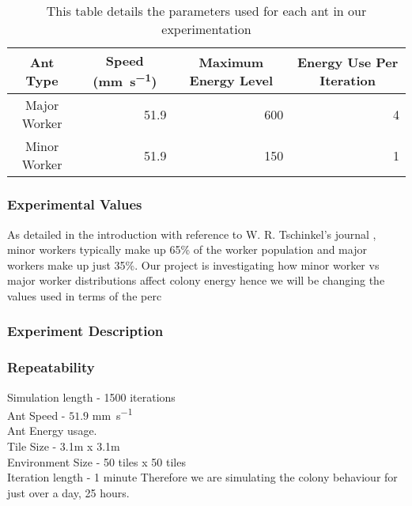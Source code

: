 \begin{table}[htb]
  \centering
  \caption{This table details the parameters used for each ant in our experimentation}
  \label{tab:ant-parameters}
  \begin{tabular}{@{}crrr@{}}
  \toprule
  Ant Type     & \multicolumn{1}{c}{Speed (\si{mm.s^{-1}})} & \multicolumn{1}{c}{Maximum Energy Level} & \multicolumn{1}{c}{Energy Use Per Iteration} \\ \midrule
  Major Worker & 51.9                             &  600                                    & 4                                         \\ \midrule
  Minor Worker & 51.9                              & 150                                     & 1                                         \\ \bottomrule
  \end{tabular}
\end{table}
 
 \subsubsection{Experimental Values}
 
 As detailed in the introduction with reference to W. R. Tschinkel's journal \cite{Tschinkel1988}, minor workers typically make up 65\% of the worker population and major workers make up just 35\%. Our project is investigating how minor worker vs major worker distributions affect colony energy hence we will be changing the values used in terms of the perc
 
 \subsubsection{Experiment Description}
 
 \subsubsection{Repeatability}


Simulation length - 1500 iterations\\
Ant Speed - $51.9$ \si{mm.s^{-1}} \cite{Burd2003}\\
Ant Energy usage.\\ 
Tile Size - 3.1m x 3.1m\\
Environment Size - 50 tiles x 50 tiles\\

Iteration length - 1 minute
Therefore we are simulating the colony behaviour for just over a day, 25 hours.


